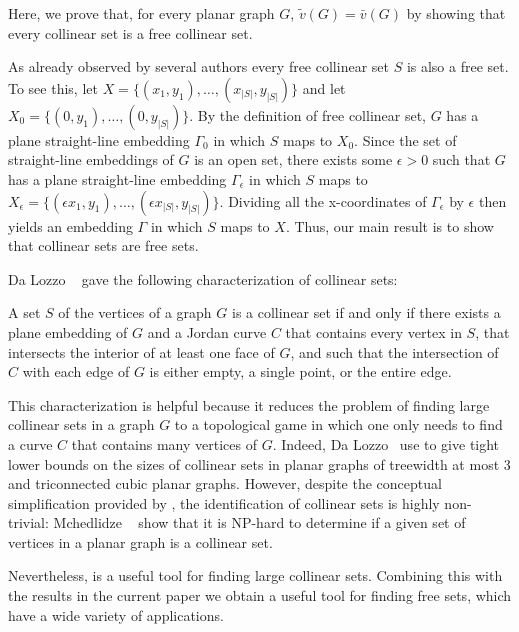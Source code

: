 \documentclass{patmorin}
\begin{document}
 Here, we prove that, for every planar graph $G$,
$\tilde{v}(G)=\bar{v}(G)$ by showing that every collinear set is a free
collinear set.

As already observed by several authors \cite{X} every
free collinear set $S$ is also a free set. To see this,
let $X=\{(x_1,y_1),\ldots,(x_{|S|},y_{|S|})\}$ and let
$X_0=\{(0,y_1),\ldots,(0,y_{|S|})\}$.  By the definition of free
collinear set, $G$ has a plane straight-line embedding $\Gamma_0$ in
which $S$ maps to $X_0$.  Since the set of straight-line embeddings of
$G$ is an open set, there exists some $\epsilon >0$ such that $G$ has a
plane straight-line embedding $\Gamma_{\epsilon}$ in which $S$ maps to
$X_\epsilon=\{(\epsilon x_1,y_1),\ldots,(\epsilon x_{|S|},y_{|S|})\}$.
Dividing all the x-coordinates of $\Gamma_\epsilon$ by $\epsilon$ then
yields an embedding $\Gamma$ in which $S$ maps to $X$. Thus, our main
result is to show that collinear sets are free sets.

Da Lozzo \etal\ \cite{dalozzo.dujmovic.ea:drawing} gave the following
characterization of collinear sets:

\begin{thm}
   A set $S$ of the vertices of a graph $G$ is a collinear set if and
   only if there exists a plane embedding of $G$ and a Jordan curve $C$
   that contains every vertex in $S$, that intersects the interior of
   at least one face of $G$, and such that the intersection of $C$ with
   each edge of $G$ is either empty, a single point, or the entire edge.
\end{thm}

This characterization is helpful because it reduces the problem of
finding large collinear sets in a graph $G$ to a topological game in
which one only needs to find a curve $C$ that contains many vertices
of $G$.  Indeed, Da Lozzo \etal\ use  to give
tight lower bounds on the sizes of collinear sets in planar graphs
of treewidth at most 3 and triconnected cubic planar graphs.  However,
despite the conceptual simplification provided by ,
the identification of collinear sets is highly non-trivial: Mchedlidze
\etal\ \cite{mchedlidze.radermacher.ea:aligned} show that it is NP-hard to
determine if a given set of vertices in a planar graph is a collinear
set.

Nevertheless,  is a useful tool for finding large 
collinear
sets. Combining this with the results in the current paper we obtain
a useful tool for finding free sets, which have a wide variety of
applications.
\end{document}
